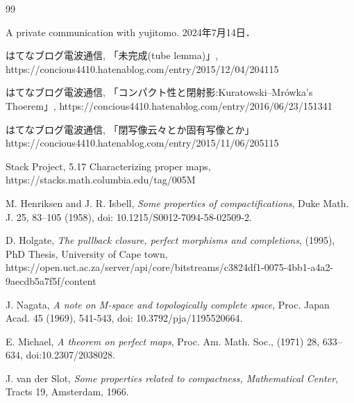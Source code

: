 \documentclass[leqno, a4paper, 12pt, dvipdfmx]{jsarticle}
\begin{document}
\begin{thebibliography}{99}


A private communication with yujitomo.
2024年7月14日．

はてなブログ電波通信,
「未完成(tube lemma)」,
https://concious4410.hatenablog.com/entry/2015/12/04/204115


はてなブログ電波通信,
「コンパクト性と閉射影:Kuratowski--Mr\'{o}wka's Thoerem」,
https://concious4410.hatenablog.com/entry/2016/06/23/151341

はてなブログ電波通信,
「閉写像云々とか固有写像とか」
https://concious4410.hatenablog.com/entry/2015/11/06/205115

Stack Project, 5.17 Characterizing proper maps,
https://stacks.math.columbia.edu/tag/005M



M. Henriksen and J. R. Isbell,
\textit{Some properties of compactifications},
Duke Math. J. 25, 83--105 (1958),
doi: 10.1215/S0012-7094-58-02509-2.

D. Holgate,
\textit{The pullback closure, perfect morphisms and completions},  (1995), PhD Thesis, University of Cape town,
https://open.uct.ac.za/server/api/core/bitstreams/c3824df1-0075-4bb1-a4a2-9aecdb5a7f5f/content


J. Nagata,
\textit{A note on M-space and topologically complete space}, Proc. Japan
Acad. 45 (1969), 541-543,
doi: 10.3792/pja/1195520664.

E. Michael,
\textit{A theorem on perfect maps},
Proc. Am. Math. Soc.,
(1971) 28,
633--634,
doi:10.2307/2038028.

 J. van der Slot,
 \textit{Some properties related to compactness, Mathematical Center},
Tracts 19, Amsterdam, 1966.

\end{thebibliography}
\end{document}
